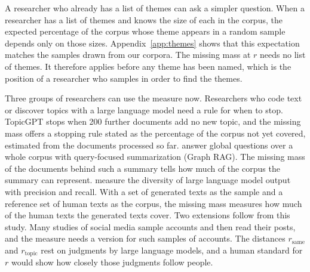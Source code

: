 A researcher who already has a list of themes can ask a simpler question. When a researcher has a list of themes and knows the size of each in the corpus, the expected percentage of the corpus whose theme appears in a random sample depends only on those sizes. Appendix~\ref{app:themes} shows that this expectation matches the samples drawn from our corpora. The missing mass at $r$ needs no list of themes. It therefore applies before any theme has been named, which is the position of a researcher who samples in order to find the themes.

Three groups of researchers can use the measure now. Researchers who code text or discover topics with a large language model need a rule for when to stop. TopicGPT \citep{pham2024topicgpt} stops when 200 further documents add no new topic, and the missing mass offers a stopping rule stated as the percentage of the corpus not yet covered, estimated from the documents processed so far. \citet{edge2024graphrag} answer global questions over a whole corpus with query-focused summarization (Graph RAG). The missing mass of the documents behind such a summary tells how much of the corpus the summary can represent. \citet{lebronnec2024} measure the diversity of large language model output with precision and recall. With a set of generated texts as the sample and a reference set of human texts as the corpus, the missing mass measures how much of the human texts the generated texts cover. Two extensions follow from this study. Many studies of social media sample accounts and then read their posts, and the measure needs a version for such samples of accounts. The distances $r_{\mathrm{same}}$ and $r_{\mathrm{topic}}$ rest on judgments by large language models, and a human standard for $r$ would show how closely those judgments follow people.
